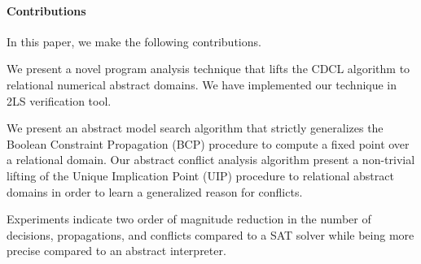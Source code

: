 \paragraph{Contributions}
In this paper, we make the following contributions.
\begin{compactenum}
\item We present a novel program analysis technique that 
lifts the CDCL algorithm to relational numerical abstract domains.   
We have implemented our technique in 2LS verification tool.  

\item We present an abstract model search algorithm that strictly 
generalizes the Boolean Constraint Propagation (BCP) procedure to
compute a fixed point over a relational domain.  Our abstract 
conflict analysis algorithm present a non-trivial lifting of the 
Unique Implication Point (UIP) procedure to relational abstract 
domains in order to learn a generalized reason for conflicts.  
 
\item  Experiments indicate two order of magnitude reduction 
in the number of decisions, propagations, and conflicts compared 
to a SAT solver while being more precise compared to an abstract interpreter.  
\end{compactenum}
